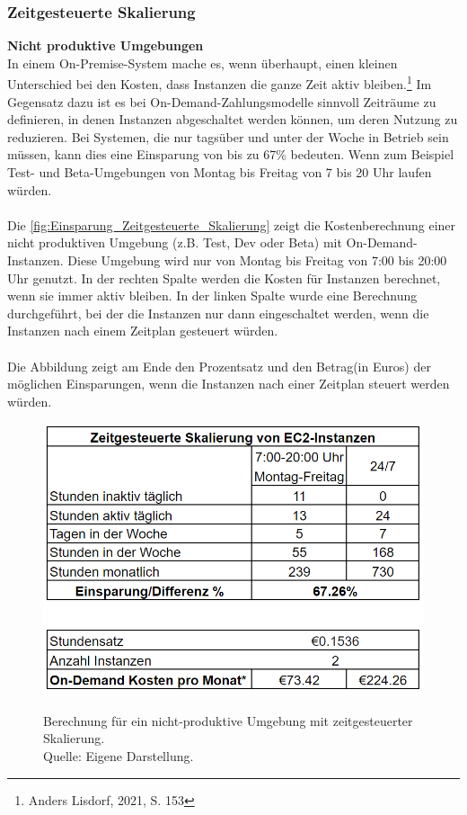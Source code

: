 \subsubsection{Zeitgesteuerte Skalierung}\label{ssec:ZeitgesteuerteScal}
\textbf{Nicht produktive Umgebungen}\\
In einem On-Premise-System mache es, wenn überhaupt, einen kleinen Unterschied bei den Kosten, dass Instanzen die ganze Zeit aktiv bleiben.\footnote{Anders Lisdorf, 2021, S. 153\cite{CCB}} %
Im Gegensatz dazu ist es bei On-Demand-Zahlungsmodelle sinnvoll Zeiträume zu definieren, in denen Instanzen abgeschaltet werden können, um deren Nutzung zu reduzieren. Bei Systemen, die nur tagsüber und unter der Woche in Betrieb sein müssen, kann dies eine Einsparung von bis zu 67\% bedeuten. Wenn zum Beispiel Test- und Beta-Umgebungen von Montag bis Freitag von 7 bis 20 Uhr laufen würden. 
\\\\
Die \autoref{fig:Einsparung_Zeitgesteuerte_Skalierung} zeigt die Kostenberechnung einer nicht produktiven Umgebung (z.B. Test, Dev oder Beta) mit On-Demand-Instanzen. Diese Umgebung wird nur von Montag bis Freitag von 7:00 bis 20:00 Uhr genutzt. In der rechten Spalte werden die Kosten für Instanzen berechnet, wenn sie immer aktiv bleiben. In der linken Spalte wurde eine Berechnung durchgeführt, bei der die Instanzen nur dann eingeschaltet werden, wenn die Instanzen nach einem Zeitplan gesteuert würden.
\\\\
Die Abbildung zeigt am Ende den Prozentsatz und den Betrag(in Euros) der möglichen Einsparungen, wenn die Instanzen nach einer Zeitplan steuert werden würden.
\begin{figure}[h]
  \centering
  \includegraphics[scale=0.6]{sources/Einsparung_Zeitgesteuerte_Skalierung}
  \caption[Berechnung für ein nicht produktives Umgebung mit Zeitgesteuerte Skalierung]{}
  \label{fig:Einsparung_Zeitgesteuerte_Skalierung} 
  Berechnung für ein nicht-produktive Umgebung mit zeitgesteuerter Skalierung. \\
  Quelle: Eigene Darstellung.
\end{figure}
